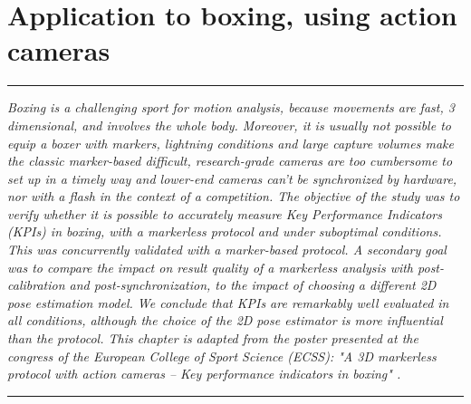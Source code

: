 
\lhead[\fancyplain{}{\leftmark}]%
      {\fancyplain{}{}} %
\chead[\fancyplain{}{}]%
      {\fancyplain{}{}}
\rhead[\fancyplain{}{}]%
      {\fancyplain{}{\rightmark}}%
\lfoot[\fancyplain{}{}]%
      {\fancyplain{}{}}
\cfoot[\fancyplain{}{\thepage}]%
      {\fancyplain{}{\thepage}} %
\rfoot[\fancyplain{}{}]%
     {\fancyplain{}{\scriptsize}}



\chapter{Application to boxing, using action cameras}
\label{ch:6}


\begin{center}
\rule{0.7\linewidth}{.5pt}
\begin{minipage}{0.7\linewidth}
\smallskip

\textit{Boxing is a challenging sport for motion analysis, because movements are fast, 3 dimensional, and involves the whole body. Moreover, it is usually not possible to equip a boxer with markers, lightning conditions and large capture volumes make the classic marker-based difficult, research-grade cameras are too cumbersome to set up in a timely way and lower-end cameras can't be synchronized by hardware, nor with a flash in the context of a competition.\newline\newline
The objective of the study was to verify whether it is possible to accurately measure Key Performance Indicators (KPIs) in boxing, with a markerless protocol and under suboptimal conditions. This was concurrently validated with a marker-based protocol. A secondary goal was to compare the impact on result quality of a markerless analysis with post-calibration and post-synchronization, to the impact of choosing a different 2D pose estimation model. We conclude that KPIs are remarkably well evaluated in all conditions, although the choice of the 2D pose estimator is more influential than the protocol. \newline \newline
This chapter is adapted from the poster presented at the congress of the European College of Sport Science (ECSS): "A 3D markerless protocol with action cameras – Key performance indicators in boxing" \cite{Pagnon2022c}.
}

\end{minipage}
\smallskip
\rule{0.7\linewidth}{.5pt}
\end{center}

